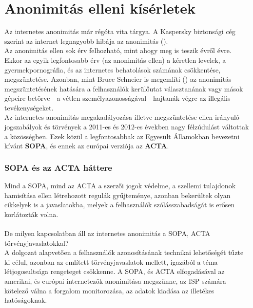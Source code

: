 \section{Anonimitás elleni kísérletek} %
\label{ssub:subsubsection_name}

Az internetes anonimitás már régóta vita tárgya. A Kaspersky biztonsági cég szerint az internet legnagyobb hibája az anonimitás (\cite{kaspersky}).\hfill\\

Az anonimitás ellen sok érv felhozható, mint ahogy meg is teszik évről évre. Ekkor az egyik legfontosabb érv (az anonimitás ellen) a kéretlen levelek, a gyermekpornográfia, és az internetes behatolások számának csökkentése, megszüntetése. Azonban, mint Bruce Schneier is megemlíti (\cite{schneier}) az anonimitás megszüntetésének hatására a felhasználók kerülőutat választanának vagy mások gépeire betörve - a vétlen személyazonosságával - hajtanák végre az illegális tevékenységeket.\hfill\\

Az internetes anonimitás megakadályozása illetve megszüntetése ellen irányuló jogszabályok és törvények a 2011-es és 2012-es években nagy félzúdulást váltottak a közösségben. Ezek közül a legfontosabbak az Egyesült Államokban bevezetni kívánt \textbf{SOPA}, és ennek az európai verziója az \textbf{ACTA}.

\subsubsection{SOPA és az ACTA háttere} %
\label{ssect:sopa_és_az_acta_háttere}
Mind a SOPA, mind az ACTA a szerzői jogok védelme, a szellemi tulajdonok hamisítása ellen létrehozott regulák gyűjteménye, azonban bekerültek olyan cikkelyek is a javaslatokba, melyek a felhasználók szólásszabadságát is erősen korlátozták volna.\hfill\\
\\
De milyen kapcsolatban áll az internetes anonimitás a SOPA, ACTA törvényjavaslatokkal?
\\
A dolgozat alapvetően a felhasználók azonosításának technikai lehetőségét tűzte ki célul, azonban az említett törvényjavaslatok mellett, igazából a téma létjogosultsága rengeteget csökkenne. A SOPA, és ACTA elfogadásával az amerikai, és európai internetezők anonimitása megszűnne, az ISP számára kötelező válna a forgalom monitorozása, az adatok kiadása az illetékes hatóságoknak. \cite{thn_sopa} 

